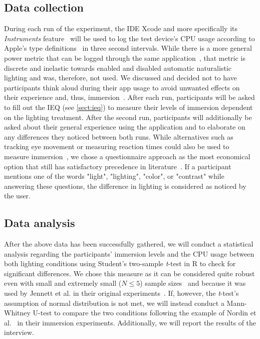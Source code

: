 \documentclass[12pt,twoside,english]{article}
\begin{document}
\subsection{Data collection}
\label{sect:data_collection}

During each run of the experiment, the \gls{IDE} Xcode and more specifically its \textit{Instruments} feature~\cite{apple_xcode_nodate} will be used to log the test device's \gls{CPU} usage according to Apple's type definitions~\cite{apple_system_nodate} in three second intervals.
While there is a more general power metric that can be logged through the same application~\cite{apple_energy_nodate-1}, that metric is discrete and inelastic towards enabled and disabled automatic naturalistic lighting and was, therefore, not used.
We discussed and decided not to have participants think aloud during their app usage to avoid unwanted effects on their experience and, thus, immersion~\cite{van_den_haak_retrospective_2003}.
After each run, participants will be asked to fill out the \gls{IEQ} (see \ref{sect:ieq}) to measure their levels of immersion dependent on the lighting treatment.
After the second run, participants will additionally be asked about their general experience using the application and to elaborate on any differences they noticed between both runs.
While alternatives such as tracking eye movement or measuring reaction times could also be used to measure immersion~\cite{jennett_measuring_2008}, we chose a questionnaire approach as the most economical option that still has satisfactory precedence in literature~\cite{boyle_engagement_2012}.
If a participant mentions one of the words "light", "lighting", "color", or "contrast" while answering these questions, the difference in lighting is considered as noticed by the user.

\subsection{Data analysis}
\label{sect:data_analysis}

After the above data has been successfully gathered, we will conduct a statistical analysis regarding the participants' immersion levels and the \gls{CPU} usage between both lighting conditions using Student's two-sample \textit{t}-test in R to check for significant differences.
We chose this measure as it can be considered quite robust even with small and extremely small ($ N \leq 5 $) sample sizes~\cite{de_winter_using_2013} and because it was used by Jennett et al. in their original experiments~\cite{jennett_measuring_2008}.
If, however, the \textit{t}-test's assumption of normal distribution is not met, we will instead conduct a Mann-Whitney U-test to compare the two conditions following the example of Nordin et al.~\cite{nordin_attention_2013} in their immersion experiments.
Additionally, we will report the results of the interview.
\end{document}
